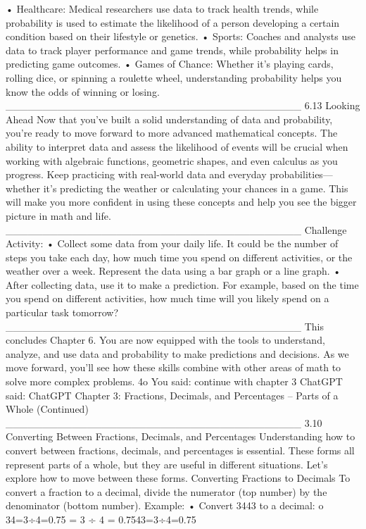 •	Healthcare: Medical researchers use data to track health trends, while probability is used to estimate the likelihood of a person developing a certain condition based on their lifestyle or genetics.
•	Sports: Coaches and analysts use data to track player performance and game trends, while probability helps in predicting game outcomes.
•	Games of Chance: Whether it’s playing cards, rolling dice, or spinning a roulette wheel, understanding probability helps you know the odds of winning or losing.
________________________________________
6.13 Looking Ahead
Now that you’ve built a solid understanding of data and probability, you’re ready to move forward to more advanced mathematical concepts. The ability to interpret data and assess the likelihood of events will be crucial when working with algebraic functions, geometric shapes, and even calculus as you progress.
Keep practicing with real-world data and everyday probabilities—whether it’s predicting the weather or calculating your chances in a game. This will make you more confident in using these concepts and help you see the bigger picture in math and life.
________________________________________
Challenge Activity:
•	Collect some data from your daily life. It could be the number of steps you take each day, how much time you spend on different activities, or the weather over a week. Represent the data using a bar graph or a line graph.
•	After collecting data, use it to make a prediction. For example, based on the time you spend on different activities, how much time will you likely spend on a particular task tomorrow?
________________________________________
This concludes Chapter 6. You are now equipped with the tools to understand, analyze, and use data and probability to make predictions and decisions. As we move forward, you’ll see how these skills combine with other areas of math to solve more complex problems.
4o
You said:
continue with chapter 3
ChatGPT said:
ChatGPT
Chapter 3: Fractions, Decimals, and Percentages – Parts of a Whole (Continued)
________________________________________
3.10 Converting Between Fractions, Decimals, and Percentages
Understanding how to convert between fractions, decimals, and percentages is essential. These forms all represent parts of a whole, but they are useful in different situations. Let's explore how to move between these forms.
Converting Fractions to Decimals
To convert a fraction to a decimal, divide the numerator (top number) by the denominator (bottom number).
Example:
•	Convert 3443 to a decimal:
o	34=3÷4=0.75 = 3 ÷ 4 = 0.7543=3÷4=0.75
